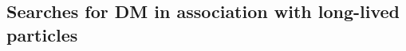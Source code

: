 \subsection{Searches for DM in association with long-lived particles}
\label{sec:results_LLPSearches}





%
%
%
%
%


%
%
%
%
%



